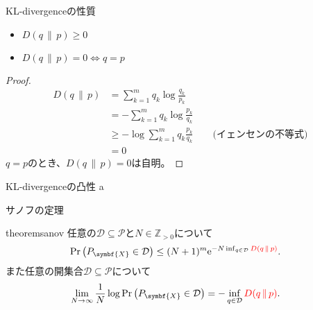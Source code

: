\documentclass[lualatex,handout]{beamer}
\newcommand{\mycolor}[2]{%
  \begingroup
  \colorlet{currentcolor}{.}%
  \color{#1}#2%
  \color{currentcolor}%
  \endgroup
}
\newcommand{\emm}[1]{\mycolor{red}{#1}}
\newcommand\KL[2]{D(#1\,\|\,#2)}
\theoremstyle{definition}
\begin{document}
\begin{frame}{KL-divergenceの性質}
\begin{lemma}
\begin{itemize}
\item $\KL{q}{p}\ge 0$
\item $\KL{q}{p}= 0\iff q=p$
\end{itemize}
\end{lemma}
\begin{proof}
\begin{align*}
\KL{q}{p} &= \sum_{k=1}^m q_k\log \frac{q_k}{p_k}\\
&= -\sum_{k=1}^m q_k\log \frac{p_k}{q_k}\\
&\ge -\log \sum_{k=1}^m q_k\frac{p_k}{q_k}\qquad\text{(イェンセンの不等式)}\\
&=0
\end{align*}
$q=p$のとき、$\KL{q}{p}=0$は自明。
\end{proof}
\end{frame}

\begin{frame}{KL-divergenceの凸性}
a
\end{frame}

\begin{frame}{サノフの定理}
\begin{restatable}[サノフの定理]{theorem}{sanov}
任意の$\mathcal{D}\subseteq\mathcal{P}$と$N\in\mathbb{Z}_{>0}$について
\begin{align*}
\Pr\left(P_{\symbf{X}} \in \mathcal{D}\right) &\le (N+1)^m \mathrm{e}^{-N\inf_{q\in \mathcal{D}} \emm{\KL{q}{p}}}.
\end{align*}
また任意の開集合$\mathcal{D}\subseteq\mathcal{P}$について
\begin{align*}
\lim_{N\to\infty}\frac1N\log \Pr\left(P_{\symbf{X}} \in \mathcal{D}\right) &= -\inf_{q\in \mathcal{D}} \emm{\KL{q}{p}}.
\end{align*}
\end{restatable}
\end{frame}
\end{document}
